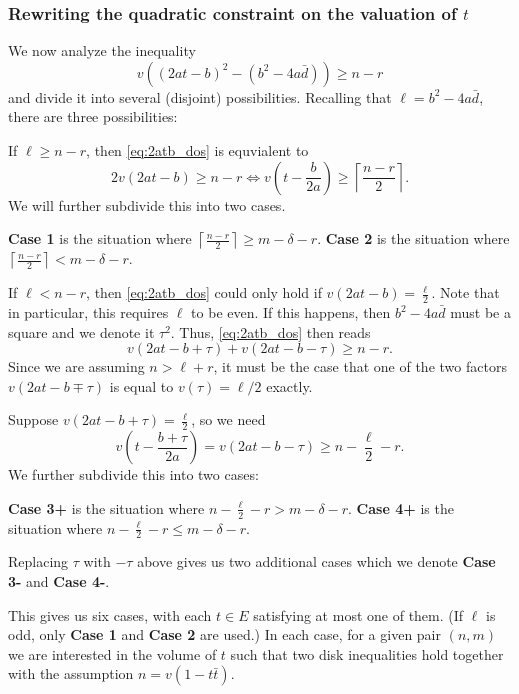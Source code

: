 \subsubsection{Rewriting the quadratic constraint on the valuation of $t$}
We now analyze the inequality
\begin{equation}
  v\left( (2at-b)^2 - (b^2-4a\bar d) \right) \geq n-r
  \label{eq:2atb_dos}
\end{equation}
and divide it into several (disjoint) possibilities.
Recalling that $\ell = b^2 - 4 a \bar d$, there are three possibilities:
\begin{itemize}
  \ii If $\ell \ge n-r$, then \eqref{eq:2atb_dos} is equvialent to
  \[ 2v(2at-b) \ge n-r
    \iff v\left( t - \frac{b}{2a} \right) \ge \left\lceil \frac{n-r}{2} \right\rceil. \]
  We will further subdivide this into two cases.
  \begin{itemize}
    \ii \textbf{Case 1} is the situation where $\left\lceil \frac{n-r}{2} \right\rceil \ge m - \delta - r$.
    \ii \textbf{Case 2} is the situation where $\left\lceil \frac{n-r}{2} \right\rceil < m - \delta - r$.
  \end{itemize}

  \ii If $\ell < n-r$, then \eqref{eq:2atb_dos} could only hold if $v(2at-b) = \frac{\ell}{2}$.
  Note that in particular, this requires $\ell$ to be even.
  If this happens, then $b^2 - 4 a \bar d$ must be a square and we denote it $\tau^2$.
  Thus, \eqref{eq:2atb_dos} then reads
  \[ v(2at-b+\tau) + v(2at-b-\tau) \ge n-r. \]
  Since we are assuming $n > \ell + r$,
  it must be the case that one of the two factors
  $v(2at-b\mp\tau)$ is equal to $v(\tau) = \ell / 2$ exactly.

  Suppose $v(2at-b+\tau) = \frac{\ell}{2}$, so we need
  \[ v\left( t - \frac{b+\tau}{2a} \right) = v(2at-b-\tau) \ge n - \frac{\ell}{2} - r. \]
  We further subdivide this into two cases:
  \begin{itemize}
    \ii \textbf{Case 3\ts+} is the situation where $n - \frac{\ell}{2} - r > m - \delta - r$.
    \ii \textbf{Case 4\ts+} is the situation where $n - \frac{\ell}{2} - r \le m - \delta - r$.
  \end{itemize}
  Replacing $\tau$ with $-\tau$ above gives us two additional cases
  which we denote \textbf{Case 3\ts-} and \textbf{Case 4\ts-}.
\end{itemize}

This gives us six cases, with each $t \in E$ satisfying at most one of them.
(If $\ell$ is odd, only \textbf{Case 1} and \textbf{Case 2} are used.)
In each case, for a given pair $(n,m)$ we are interested in the volume of $t$
such that two disk inequalities hold together with the assumption $n = v(1-t \bar t)$.

